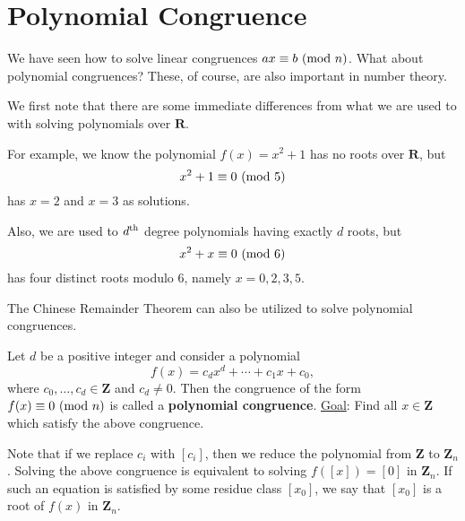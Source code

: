 \section{Polynomial Congruence}
We have seen how to solve linear congruences $ ax\equiv b\ (\mathrm{mod}\ n) $. What about
polynomial congruences? These, of course, are also important in number theory.

We first note that there are some immediate differences from what we are used
to with solving polynomials over $ \mathbf{R} $.

For example, we know the polynomial $ f(x)=x^2+1 $ has no roots over $ \mathbf{R} $,
but
\[ x^2+1\equiv 0\ (\mathrm{mod}\ 5) \]
has $ x=2 $ and $ x=3 $ as solutions.

Also, we are used to $ d{\textsuperscript{th}} $ degree polynomials having exactly $ d $ roots,
but
\[ x^2+x\equiv 0\ (\mathrm{mod}\ 6) \]
has four distinct roots modulo $ 6 $, namely $ x=0,2,3,5 $.

The Chinese Remainder Theorem can also be utilized to solve polynomial congruences.

\begin{Definition}{}{}
    Let $d$ be a positive integer and consider a polynomial
    \[ f(x)=c_d x^d+\cdots + c_1 x+c_0, \]
    where $ c_0,\ldots,c_d\in\mathbf{Z} $ and $ c_d \ne 0 $. Then the congruence of the form
    $ f(x)\equiv 0\ (\mathrm{mod}\ n) $ is called a \textbf{polynomial congruence}.
    \tcblower{}
    \underline{Goal}: Find all $ x\in\mathbf{Z} $ which satisfy the above congruence.
\end{Definition}

Note that if we replace $ c_i $ with $ [c_i] $, then we reduce the polynomial
from $ \mathbf{Z} $ to $ \mathbf{Z}_n $. Solving the above congruence is equivalent to solving
$ f([x])=[0] $ in $ \mathbf{Z}_n $. If such an equation is satisfied by some residue
class $ [x_0] $, we say that $ [x_0] $ is a root of $ f(x) $ in $ \mathbf{Z}_n $.